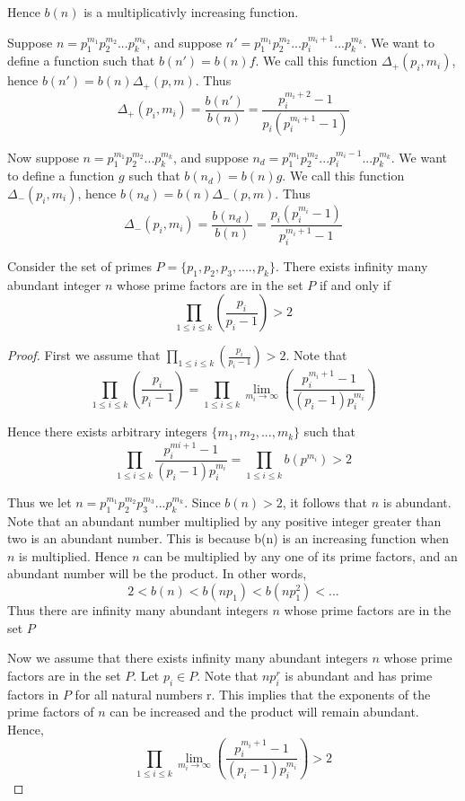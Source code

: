 \documentclass[../paper.tex]{article}
\begin{document}
Hence $b(n)$ is a multiplicativly increasing function.


Suppose $n=p_1^{m_1}p_2^{m_2}...p_{k}^{m_k}$, and suppose 
$n'=p_1^{m_1}p_2^{m_2}...p_i^{m_i + 1}...p_{k}^{m_k}$. We want
to define a function such that $b(n') = b(n) f$. We call this
function $\Delta_{+}(p_i, m_i)$, hence $b(n') = b(n) \Delta_{+}(p,m)$.
Thus 
%
$$\Delta_{+}(p_i, m_i) = \frac{b(n')}{b(n)} = 
\frac{p_i^{m_i+2} - 1}{ p_i (p_i^{m_i + 1} - 1)}$$
%

	Now suppose $n=p_1^{m_1}p_2^{m_2}...p_{k}^{m_k}$, and suppose 
$n_d=p_1^{m_1}p_2^{m_2}...p_i^{m_i - 1}...p_{k}^{m_k}$. We want
to define a function $g$ such that $b(n_d) = b(n) g$. We call this
function $\Delta_{-}(p_i, m_i)$, hence $b(n_d) = b(n) \Delta_{-}(p,m)$.
Thus 
%
$$\Delta_{-}(p_i, m_i) = \frac{b(n_d)}{b(n)} = 
\frac{p_i(p_i^{m_i} - 1)}{ p_i^{m_i + 1} - 1}$$
%

\begin{theorem} Consider the set of primes 
%
$P = \{p_{1}, p_{2}, p_{3}, .... , p_{k}\}$.
%
There exists infinity many abundant integer $n$ whose prime 
factors are in the set $P$  if and only if
%
$$\prod_{1 \leq i \leq k} (\frac{p_{i}}{p_{i} -1}) > 2$$
%
\end{theorem}

\begin{proof}

First we assume that  
%
$\prod_{1 \leq i \leq k} (\frac{p_{i}}{p_{i} -1}) > 2$.
%
Note that
%  
$$\prod_{1 \leq i \leq k} (\frac{p_{i}}{p_{i} -1}) 
%
= \prod_{1 \leq i \leq k} \lim_{m_i \rightarrow \infty} 
%
( \frac{p_i^{m_{i} + 1} -1}{(p_i -1)p_{i}^{m_{i}}}) $$

Hence there exists arbitrary integers $\{m_1, m_2, ... , m_k\}$ 
such that 
%
$$\prod_{1 \leq i \leq k} \frac{p_i^{m{i} + 1} -1}
{(p_i -1)p_{i}^{m_{i}}} = \prod_{1 \leq i \leq k} b(p^{m_i}) > 2$$
%

Thus we let $n=p_1^{m_1}p_2^{m_2}p_3^{m_3}...p_{k}^{m_k}$. 
Since $b(n) > 2$, it follows that $n$ is abundant. Note that an 
abundant number multiplied by any positive integer greater than two
is an abundant number. This is because b(n) is an increasing function
when $n$ is multiplied. Hence $n$ can be multiplied by any one of its prime 
factors, and an abundant number will be the product. In other words,
%
$$2 < b(n) < b(np_1) < b(np_1^2) < ...$$
%
Thus there
are infinity many abundant integers $n$ whose prime factors are 
in the set $P$

Now we assume that there exists infinity many abundant integers 
$n$ whose prime factors are in the set $P$. Let $p_i \in P$. Note
that $np_i^r$ is abundant and has prime factors in $P$ for all 
natural numbers r. This implies that the exponents of the prime 
factors of $n$ can be increased and the product will remain abundant. Hence,
%
$$\prod_{1 \leq i \leq k} \lim_{m_i \rightarrow \infty} 
( \frac{p_i^{m_{i} + 1} -1}{(p_i -1)p_{i}^{m_{i}}}) > 2$$

\end{proof}
\end{document}
